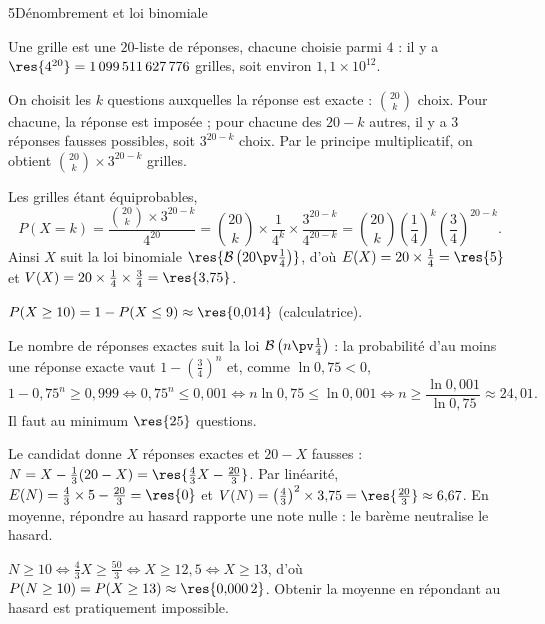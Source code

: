 

\begin{corrigeBac}{5}{Dénombrement et loi binomiale}
\begin{questions}
  \item Une grille est une $20$-liste de réponses, chacune choisie parmi $4$ : il y a $\res{4^{20}}=1\,099\,511\,627\,776$ grilles,
    soit environ $1{,}1\times10^{12}$. 
  \item On choisit les $k$ questions auxquelles la réponse est exacte : $\binom{20}{k}$ choix. Pour chacune, la réponse est imposée ; pour
    chacune des $20-k$ autres, il y a $3$ réponses fausses possibles, soit $3^{20-k}$ choix. Par le principe multiplicatif, on obtient
    $\binom{20}{k}\times3^{20-k}$ grilles. 
\end{questions}
\begin{questions}[resume]
  \item Les grilles étant équiprobables,
    \[P(X=k)=\frac{\binom{20}{k}\times3^{20-k}}{4^{20}}=\binom{20}{k}\times\frac{1}{4^{k}}\times\frac{3^{20-k}}{4^{20-k}}
      =\binom{20}{k}\left(\frac14\right)^{k}\left(\frac34\right)^{20-k}.\]
    Ainsi $X$ suit la loi binomiale $\res{\mathcal{B}\left(20\pv\tfrac14\right)}$, d'où $E(X)=20\times\frac14=\res{5}$ et
    $V(X)=20\times\frac14\times\frac34=\res{3{,}75}$. \pts{1 pt}
  \item $P(X\geq10)=1-P(X\leq9)\approx\res{0{,}014}$ (calculatrice). 
  \item Le nombre de réponses exactes suit la loi $\mathcal{B}\left(n\pv\frac14\right)$ : la probabilité d'au moins une réponse exacte
    vaut $1-\left(\frac34\right)^{n}$ et, comme $\ln0{,}75<0$,
    \[1-0{,}75^{n}\geq0{,}999\iff0{,}75^{n}\leq0{,}001\iff n\ln0{,}75\leq\ln0{,}001\iff n\geq\frac{\ln0{,}001}{\ln0{,}75}\approx24{,}01.\]
    Il faut au minimum $\res{25}$ questions. 
\end{questions}
\begin{questions}[resume]
  \item Le candidat donne $X$ réponses exactes et $20-X$ fausses : $N=X-\frac13(20-X)=\res{\tfrac43X-\tfrac{20}3}$. Par linéarité,
    $E(N)=\frac43\times5-\frac{20}3=\res{0}$ et $V(N)=\left(\frac43\right)^{2}\times3{,}75=\res{\tfrac{20}3}\approx6{,}67$. En moyenne,
    répondre au hasard rapporte une note nulle : le barème neutralise le hasard. \pts{1 pt}
  \item $N\geq10\iff\frac43X\geq\frac{50}3\iff X\geq12{,}5\iff X\geq13$, d'où $P(N\geq10)=P(X\geq13)\approx\res{0{,}000\,2}$.
    Obtenir la moyenne en répondant au hasard est pratiquement impossible. 
\end{questions}
\end{corrigeBac}

